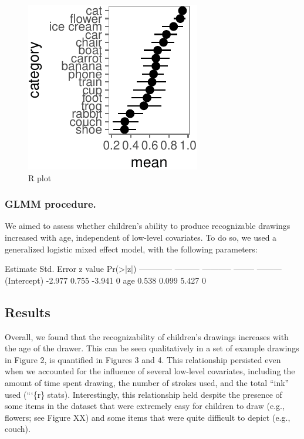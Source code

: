 \documentclass[10pt, letterpaper]{article}
\newenvironment{CodeChunk}{}{}
\begin{document}
\begin{CodeChunk}
\begin{figure}[H]

{\centering \includegraphics{figs/plot-1} 

}

\caption[R plot]{R plot}\label{fig:plot}
\end{figure}
\end{CodeChunk}

\subsubsection{GLMM procedure.}\label{glmm-procedure.}

We aimed to assess whether children's ability to produce recognizable
drawings increased with age, independent of low-level covariates. To do
so, we used a generalized logistic mixed effect model, with the
following parameters:

\begin{CodeChunk}


               Estimate   Std. Error   z value   Pr(>|z|)
------------  ---------  -----------  --------  ---------
(Intercept)      -2.977        0.755    -3.941          0
age               0.538        0.099     5.427          0

\end{CodeChunk}

\subsection{Results}\label{results}

Overall, we found that the recognizability of children's drawings
increases with the age of the drawer. This can be seen qualitatively in
a set of example drawings in Figure 2, is quantified in Figures 3 and 4.
This relationship persisted even when we accounted for the influence of
several low-level covariates, including the amount of time spent
drawing, the number of strokes used, and the total ``ink'' used
(```\{r\} stats). Interestingly, this relationship held despite the
presence of some items in the dataset that were extremely easy for
children to draw (e.g., flowers; see Figure XX) and some items that were
quite difficult to depict (e.g., couch).
\end{document}
